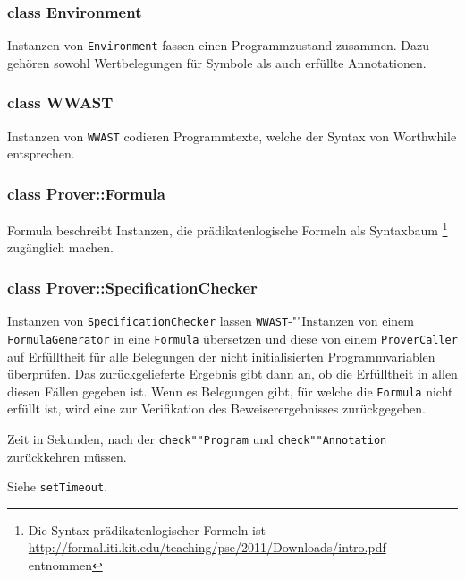 \subsubsection{class Environment}%

Instanzen von \texttt{Environment} fassen einen Programmzustand
zusammen. Dazu gehören sowohl Wertbelegungen für Symbole als auch
erfüllte Annotationen.%

\subsubsection{class WWAST}%

Instanzen von \texttt{WWAST} codieren Programmtexte, welche der Syntax
von Worthwhile entsprechen.%

\subsubsection{class Prover::Formula}%

Formula beschreibt Instanzen, die prädikatenlogische Formeln als
Syntaxbaum \footnote{Die Syntax prädikatenlogischer Formeln ist
\url{http://formal.iti.kit.edu/teaching/pse/2011/Downloads/intro.pdf}
entnommen} zugänglich machen.%

\subsubsection{class Prover::SpecificationChecker}%


Instanzen von \texttt{SpecificationChecker} lassen
\texttt{WWAST}-""Instanzen von einem \texttt{FormulaGenerator} in eine
\texttt{Formula} übersetzen und diese von einem \texttt{ProverCaller}
auf Erfülltheit für alle Belegungen der nicht initialisierten
Programmvariablen überprüfen. Das zurückgelieferte Ergebnis gibt dann
an, ob die Erfülltheit in allen diesen Fällen gegeben ist. Wenn es
Belegungen gibt, für welche die \texttt{Formula} nicht erfüllt ist,
wird eine zur Verifikation des Beweiserergebnisses zurückgegeben.%


\begin{description}%

    Zeit in Sekunden, nach der \texttt{check""Program} und
    \texttt{check""Annotation} zurückkehren müssen.%

    Siehe \texttt{setTimeout}.%


\end{description}%

